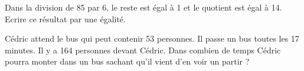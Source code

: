  
 

 Dans la division de 85 par 6, le reste est égal à 1 et le quotient est égal à 14. Ecrire ce résultat par une égalité.
 

Cédric attend le bus qui peut contenir 53 personnes. Il passe un bus toutes les 17 minutes. Il y a 164 personnes devant Cédric. Dans combien de temps Cédric pourra monter dans un bus sachant qu'il vient d'en voir un partir ?
 
 

